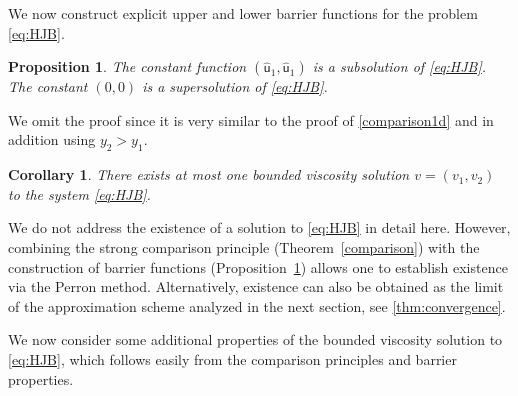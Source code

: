 \documentclass[11pt]{article}
\numberwithin{equation}{section}
\newtheorem{proposition}[theorem]{Proposition}
\newtheorem{corollary}[theorem]{Corollary}
\theoremstyle{Claim}
\def\su{{\mathsf{u}}}
\def\sv{{\mathsf{v}}}
\newcommand{\ux}{{\underline x}}
\theoremstyle{plain}
\begin{document}
We now construct explicit upper and lower barrier functions for the problem \eqref{eq:HJB}.
\begin{proposition}\label{barrier}
The constant function $(\widehat{\su}_1, \widehat{\su}_1)$ is a subsolution  of \cref{eq:HJB}. The constant $(0,0)$ is a supersolution of \cref{eq:HJB}. 
\end{proposition}
We omit the proof since it is very similar to the proof of \cref{comparison1d} and in addition using $y_2>y_1$. 
\begin{corollary}
	There exists at most one bounded viscosity solution $v=(v_1,v_2)$ to the system \eqref{eq:HJB}.  
\end{corollary}
We do not address the existence of a solution to \eqref{eq:HJB} in detail here. However, combining the strong comparison principle (Theorem~\ref{comparison}) with the construction of barrier functions (Proposition~\ref{barrier}) allows one to establish existence via the Perron method. Alternatively, existence can also be obtained as the limit of the approximation scheme analyzed in the next section, see \cref{thm:convergence}.\par
We now consider some additional properties of the bounded viscosity solution to \eqref{eq:HJB}, which follows easily from the comparison principles and barrier properties. 

\end{document}
